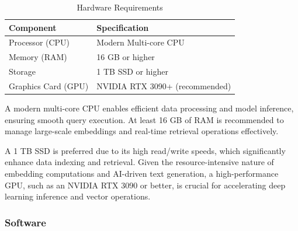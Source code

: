 \begin{refsection}
\begin{table}[H]
    \centering
    \caption{Hardware Requirements}
    \label{tab:hardware_requirements}
    \begin{tabular}{ll}
        \hline
        \textbf{Component}       & \textbf{Specification}                     \\ \hline
        Processor (CPU)          & Modern Multi-core CPU                      \\
        Memory (RAM)             & 16 GB or higher                            \\
        Storage                  & 1 TB SSD or higher                         \\
        Graphics Card (GPU)      & NVIDIA RTX 3090+ (recommended)             \\
        \hline
    \end{tabular}
\end{table}

A modern multi-core CPU enables efficient data processing and model inference, ensuring smooth query execution. At least 16 GB of RAM is recommended to manage large-scale embeddings and real-time retrieval operations effectively. 

A 1 TB SSD is preferred due to its high read/write speeds, which significantly enhance data indexing and retrieval. Given the resource-intensive nature of embedding computations and AI-driven text generation, a high-performance GPU, such as an NVIDIA RTX 3090 or better, is crucial for accelerating deep learning inference and vector operations.

\subsubsection{Software}


\end{refsection}
